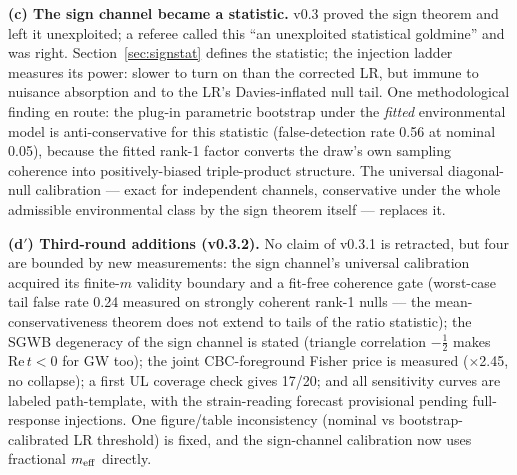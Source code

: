 \documentclass[11pt]{article}
\begin{document}
\textbf{(c) The sign channel became a statistic.} v0.3 proved the sign theorem and left it unexploited; a referee called this ``an unexploited statistical goldmine'' and was right. Section~\ref{sec:signstat} defines the statistic; the injection ladder measures its power: slower to turn on than the corrected LR, but immune to nuisance absorption and to the LR's Davies-inflated null tail. One methodological finding en route: the plug-in parametric bootstrap under the \emph{fitted} environmental model is anti-conservative for this statistic (false-detection rate 0.56 at nominal 0.05), because the fitted rank-1 factor converts the draw's own sampling coherence into positively-biased triple-product structure. The universal diagonal-null calibration --- exact for independent channels, conservative under the whole admissible environmental class by the sign theorem itself --- replaces it.

\textbf{(d$'$) Third-round additions (v0.3.2).} No claim of v0.3.1 is retracted, but four are bounded by new measurements: the sign channel's universal calibration acquired its finite-$m$ validity boundary and a fit-free coherence gate (worst-case tail false rate 0.24 measured on strongly coherent rank-1 nulls --- the mean-conservativeness theorem does not extend to tails of the ratio statistic); the SGWB degeneracy of the sign channel is stated (triangle correlation $-\tfrac12$ makes $\mathrm{Re}\,t<0$ for GW too); the joint CBC-foreground Fisher price is measured ($\times$2.45, no collapse); a first UL coverage check gives 17/20; and all sensitivity curves are labeled path-template, with the strain-reading forecast provisional pending full-response injections. One figure/table inconsistency (nominal vs bootstrap-calibrated LR threshold) is fixed, and the sign-channel calibration now uses fractional $m_{\rm eff}$ directly.
\end{document}
